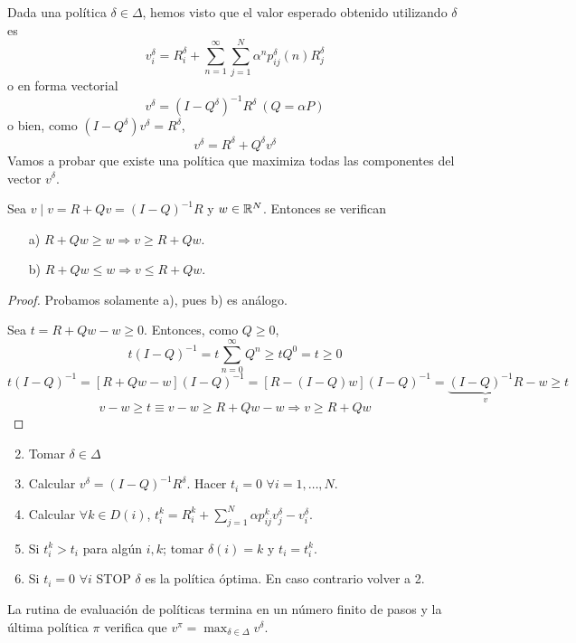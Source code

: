 \documentclass[MIOP.tex]{subfiles}
\begin{document}
Dada una política $\delta\in\Delta$, hemos visto que el valor esperado obtenido utilizando $\delta$ es
$$v_i^\delta=R^\delta_i+\sum_{n=1}^\infty\sum_{j=1}^N\alpha^n p_{ij}^\delta(n) R_j^\delta$$
o en forma vectorial
$$v^\delta=(I-Q^\delta)^{-1}R^\delta\ (Q=\alpha P)$$
o bien, como $(I-Q^\delta)v^\delta=R^\delta$,
$$v^\delta=R^\delta+Q^\delta v^\delta$$
Vamos a probar que existe una política que maximiza todas las componentes del vector $v^\delta$.

\begin{lemma}
Sea $v\mid v=R+Qv=(I-Q)^{-1}R$ y $w\in\mathbb{R}^N$. Entonces se verifican
\begin{itemize}
\item[a)] $R+Qw\geq w\Rightarrow v\geq R+Qw$.
\item[b)] $R+Qw\leq w\Rightarrow v\leq R+Qw$.
\end{itemize} 
\end{lemma}
\begin{proof}
Probamos solamente a), pues b) es análogo. 

Sea $t=R+Qw-w\geq 0$. Entonces, como $Q\geq 0$,
$$t(I-Q)^{-1}=t\sum_{n=0}^\infty Q^n\geq tQ^0=t\geq 0$$
$$t(I-Q)^{-1}=[R+Qw-w](I-Q)^{-1}=[R-(I-Q)w](I-Q)^{-1}=\underbrace{(I-Q)^{-1}R}_{v}-w\geq t$$
$$v-w\geq t\equiv v-w\geq R+Qw-w\Rightarrow v\geq R+Qw$$
\end{proof}
\begin{defi}
\begin{enumerate}
\item[]
\item Tomar $\delta \in \Delta$
\item Calcular $v^\delta = (I-Q)^{-1}R^\delta$. Hacer $t_i =0$ $\forall i=1,\dotsc,N$.
\item Calcular $\forall k\in D(i)$, $t_i^k= R_i^k + \sum_{j=1}^N \alpha p_{ij}^k v^\delta_j - v_i^\delta$. 
\item Si $t_i^k > t_i$ para algún $i,k$; tomar $\delta(i)=k$ y $t_i = t^k_i$.
\item Si $t_i = 0$ $\forall i$ STOP $\delta$ es la política óptima. En caso contrario volver a 2.
\end{enumerate}
\end{defi}
\begin{teorema}
La rutina de evaluación de políticas termina en un número finito de pasos y la última política $\pi$ verifica que $v^\pi = \max_{\delta \in \Delta} v^\delta$.
\end{teorema}
\end{document}
